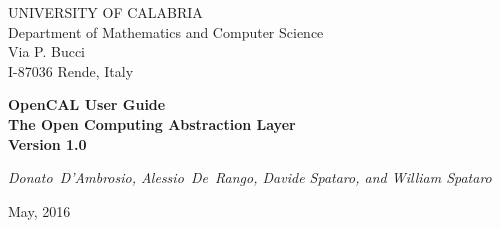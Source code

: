 \thispagestyle{empty}

\newcommand{\HS}[1][1.]{\hspace{\stretch{#1}}}
\begin{center}


\huge{UNIVERSITY OF CALABRIA}\\
\vspace*{0.25cm}
\large{Department of Mathematics and Computer Science}\\
\normalsize{Via P. Bucci\\
I-87036 Rende, Italy\\
\vspace*{0.25cm} \HS \hrulefill \HS}



\vspace*{3.5cm}

\Huge{\textbf{OpenCAL User Guide}}\\
\vspace*{0.2cm}
\large{\textbf{The Open Computing Abstraction Layer}}\\
\vspace*{0.7cm}
\Large{\textbf{Version 1.0}}
\vspace*{1cm}


\vspace*{1cm}

\normalsize{\textit{Donato~D'Ambrosio, Alessio~De~Rango, Davide Spataro, and William Spataro}}

\vspace*{3.5cm}

\normalsize{May, 2016}

\vspace*{2.0cm}



\end{center}
